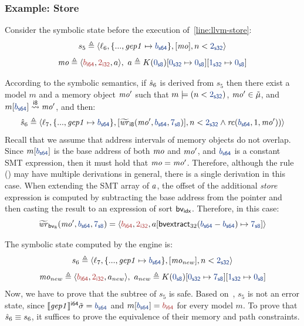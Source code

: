 \subsubsection{Example: Store}
\label{sec:example-store}
Consider the symbolic state before the execution of~\cref{line:llvm-store}:
\[
s_5 \triangleq \symstate
    {\location_6}
    {\{ ..., \nameid{gep1} \mapsto \bvconst{64}{\addr} \}}
    {[]}
    {[\mo]}
    {n < \bvconst{32}{2}}
\]
\[ \mo \triangleq \mobj{\bvval{\addr}{64}}{\bvval{2}{32}}{\arrayvalue}, \ \arrayvalue \triangleq \arraystore{\arraystore{\arrayconst{\arrayinitvalue}}{\bvconst{32}{0}}{\arrayinitvalue}}{\bvconst{32}{1}}{\arrayinitvalue} \]

According to the symbolic semantics,
if $\hat{s}_6$ is derived from $s_5$ then there exist a model $m$ and a memory object $\mathit{mo}'$ such that
$m \models (n < \bvconst{32}{2})$, $\mathit{mo}' \in \tilde{\mu}$, and $\symisinbounds{\bvconst{64}{\addr}}{\bvsort{8}}{\mo'}{m}$, and then:
\[
\mech{s}_6 \triangleq \symstate
    {\location_7}
    {\{ ..., \nameid{gep1} \mapsto \bvconst{64}{\addr} \}}
    {[]}
    {[\symmowrite{\bvsort{8}}{\mo'}{\bvconst{64}{\addr}}{\bvconst{8}{7}}]}
    {n < \bvconst{32}{2} \land \rangecond(\bvconst{64}{\addr}, 1, \mo'))}
\]
Recall that we assume that address intervals of memory objects do not overlap.
Since $m[\bvconst{64}{\addr}]$ is the base address of both $\mathit{mo}$ and $\mathit{mo}'$, and $\bvconst{64}{\addr}$ is a constant SMT expression,
then it must hold that $\mathit{mo} = \mathit{mo}'$.
Therefore, although the  rule () may have multiple derivations in general,
there is a single derivation in this case.
When extending the SMT array of $a$,
the offset of the additional \textit{store} expression is computed by subtracting the base address from the pointer and then casting the result to an expression of sort $\textsf{bv}_{\textsf{idx}}$.
Therefore, in this case:
\[ \symmowrite{\smtsort{8}}{\mo'}{\bvconst{64}{\addr}}{\bvconst{8}{7}} = \mobj{\bvval{\addr}{64}}{\bvval{2}{32}}{\arraystore{\arrayvalue}{\bvextract{32}{\bvsub{\bvsort{64}}{\bvconst{64}{\addr}}{\bvconst{64}{\addr}}}}{\bvconst{8}{7}}} \]

The symbolic state computed by the \SE engine is:
\[
s_6 \triangleq \symstate
    {\location_7}
    {\{ ..., \nameid{gep1} \mapsto \bvconst{64}{\addr} \}}
    {[]}
    {[\mo_{new}]}
    {n < \bvconst{32}{2}}
\]
\[ \mo_{new} \triangleq \mobj{\bvval{\addr}{64}}{\bvval{2}{32}}{\arrayvalue_{new}}, \ \arrayvalue_{new} \triangleq \arraystore{\arraystore{\arrayconst{\arrayinitvalue}}{\bvconst{32}{0}}{\bvconst{8}{7}}}{\bvconst{32}{1}}{\arrayinitvalue} \]
Now, we have to prove that the subtree of $s_5$ is safe.
Based on~,
$s_5$ is not an error state,
since $\evalexprty{\nameid{gep1}}{\symlocalstore}{\bvsort{64}} = \bvconst{64}{\addr}$ and $m[\bvconst{64}{\addr}] = \bvval{\addr}{64}$ for every model $m$.
To prove that $\hat{s}_6 \equiv s_6$, it suffices to prove the equivalence of their memory and path constraints.

